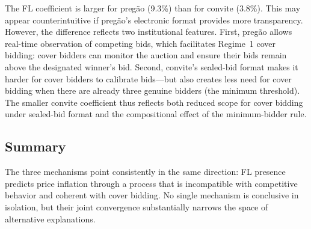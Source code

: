The FL coefficient is larger for preg\~ao (9.3\%) than for convite
(3.8\%). This may appear counterintuitive if preg\~ao's electronic
format provides more transparency. However, the difference reflects
two institutional features. First, preg\~ao allows real-time observation
of competing bids, which facilitates Regime~1 cover bidding: cover
bidders can monitor the auction and ensure their bids remain above the
designated winner's bid. Second, convite's sealed-bid format makes it
harder for cover bidders to calibrate bids---but also creates less need
for cover bidding when there are already three genuine bidders (the
minimum threshold). The smaller convite coefficient thus reflects both
reduced scope for cover bidding under sealed-bid format and the
compositional effect of the minimum-bidder rule.

\subsection{Summary}

The three mechanisms point consistently in the same direction: FL
presence predicts price inflation through a process that is incompatible
with competitive behavior and coherent with cover bidding. No single
mechanism is conclusive in isolation, but their joint convergence
substantially narrows the space of alternative explanations.
